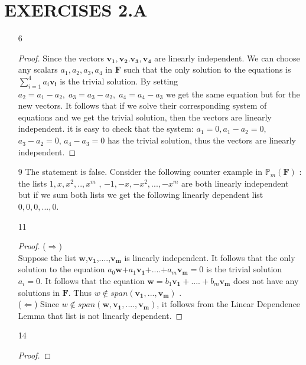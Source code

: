 \documentclass{article}
\begin{document}
\section*{EXERCISES 2.A}
\begin{enumerate}
\item[6]
\begin{proof}
Since the vectors $\bm{v_1,v_2.v_3,v_4}$ are linearly independent. We can choose any scalars $a_1,a_2,a_3,a_4$ in $\bm{F}$ such that the only solution to the equations is $\sum_{i=1}^{4}a_{i}\bm{v_i}$ is the trivial solution. By setting $a_{2} = a_{1} - a_{2},\; a_{3}= a_{3} - a_{2},\; a_{4} = a_{4}-a_{3}$ we get the same equation but for the new vectors. It follows that if we solve their corresponding system of equations and we get the trivial solution, then the vectors are linearly independent. it is easy to check that the system: $a_{1}=0, a_{1}-a_{2} = 0$, $a_{3}-a_{2}=0$, $a_{4}-a_{3}=0$ has the trivial solution, thus the vectors are linearly independent. 
\end{proof}
\item[9]The statement is false. Consider the following counter example in $\mathbb{P}_{m}(\bm{F})$ : the lists $1,x,x^2,..,x^m$ , $-1,-x,-x^2,...,-x^m$ are both linearly independent but if we sum both lists we get the following linearly dependent list $0,0,0,...,0$.
\item[11]
\begin{proof}
($\Rightarrow$)\\ Suppose the list $\bm{w}$,$\bm{v_{1}}$,....,$\bm{v_{m}}$ is linearly independent. It follows that the only solution to the equation $a_{0}\bm{w}$+$a_{1}\bm{v_{1}}$+....+$a_{m}\bm{v_{m}} = 0$ is the trivial solution $a_{i}=0$. It follows that the equation $\bm{w} = b_{1}\bm{v_{1}} + .... + b_{m}\bm{v_{m}}$ does not have any solutions in $\bm{F}$. Thus $w \not \in span(\bm{v_{1}},...,\bm{v_{m}})$ . \\
($\Leftarrow$) Since $w \not \in span(\bm{w},\bm{v_{1}},....,\bm{v_{m}})$, it follows from the Linear Dependence Lemma that list is not linearly dependent.  
\end{proof}
\item[14]
\begin{proof}

\end{proof}
\end{enumerate}
\end{document}
